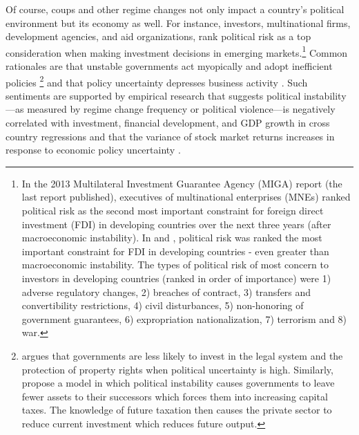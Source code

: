 \documentclass[12pt,final,fleqn]{article}
\theoremstyle{plain}
\begin{document}
Of course, coups and other regime changes not only impact a country's political environment but its economy as well. For instance, investors, multinational firms, development agencies, and aid organizations, rank political risk as a top consideration when making investment decisions in emerging markets.\footnote{In the 2013 Multilateral Investment Guarantee Agency (MIGA) \citet{wipr2013} report (the last report published), executives of multinational enterprises (MNEs) ranked political risk as the second most important constraint for foreign direct investment (FDI) in developing countries over the next three years (after macroeconomic instability). In \citet{wipr2011} and  \citet{wipr2012}, political risk was ranked the most important constraint for FDI in developing countries - even greater than macroeconomic instability. The types of political risk of most concern to investors in developing countries (ranked in order of importance) were 1) adverse regulatory changes, 2) breaches of contract, 3) transfers and convertibility restrictions, 4) civil disturbances, 5) non-honoring of government guarantees, 6) expropriation nationalization, 7) terrorism and 8) war.} Common rationales are that unstable governments act myopically and adopt inefficient policies \citep{svensson1998investment,devereux1998political}\footnote{\citet{svensson1998investment} argues that governments are less likely to invest in the legal system and the protection of property rights when political uncertainty is high. Similarly, \citet{devereux1998political} propose a model in which political instability causes governments to leave fewer assets to their successors which forces them into increasing capital taxes. The knowledge of future taxation then causes the private sector to reduce current investment which reduces future output.} and that policy uncertainty depresses business activity \citep{baker2016measuring}. Such sentiments are supported by empirical research that suggests political instability---as measured by regime change frequency or political violence---is negatively correlated with investment, financial development, and GDP growth in cross country regressions \citep{aisen2013does, alesina1996income, alesina1996political, fosu1992political, jong2009measurement, roe2011political} and that the variance of stock market returns increases in response to economic policy uncertainty \citep{leblang2005government, jensen2005market, liu2015economic}.
\end{document}
